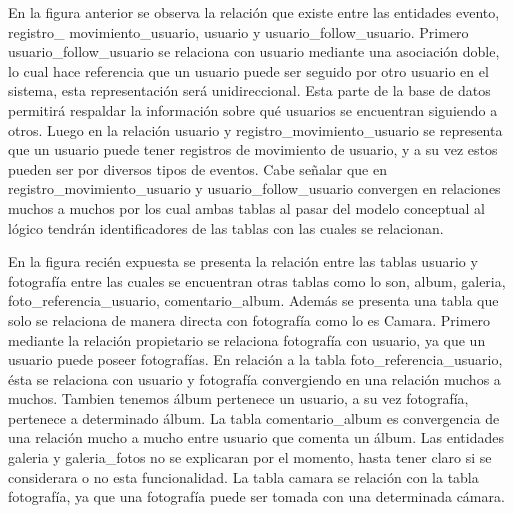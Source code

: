 \documentclass{memoria}
\begin{document}
En la figura anterior se observa la relación que existe entre las entidades evento, registro\_ movimiento\_usuario, usuario y usuario\_follow\_usuario. Primero usuario\_follow\_usuario se relaciona con usuario mediante una asociación doble, lo cual hace referencia que un usuario puede ser seguido por otro usuario en el sistema, esta representación será unidireccional.
Esta parte de la base de datos permitirá respaldar la información sobre qué usuarios se encuentran siguiendo a otros.
Luego en la relación usuario y registro\_movimiento\_usuario se representa que un usuario puede tener registros de movimiento de usuario, y a su vez estos pueden ser por diversos tipos de eventos. Cabe señalar que en registro\_movimiento\_usuario y usuario\_follow\_usuario convergen en relaciones muchos a muchos por los cual ambas tablas al pasar del modelo conceptual al lógico tendrán identificadores de las tablas con las cuales se relacionan.



En la figura recién expuesta se presenta la relación entre las tablas usuario y fotografía entre las cuales se encuentran otras tablas como lo son, album, galeria, foto\_referencia\_usuario, comentario\_album. Además se presenta una tabla que solo se relaciona de manera directa con fotografía como lo es Camara. 
Primero mediante la relación propietario se relaciona fotografía con usuario, ya que un usuario puede poseer fotografías. En relación a la tabla foto\_referencia\_usuario, ésta se relaciona con usuario y fotografía convergiendo en una relación muchos a muchos. Tambien tenemos álbum pertenece un usuario, a su vez fotografía, pertenece a determinado álbum. 
La tabla comentario\_album es convergencia de una relación mucho a mucho entre usuario que comenta un álbum. 
Las entidades galeria y galeria\_fotos no se explicaran por el momento, hasta tener claro si se considerara o no esta funcionalidad. La tabla camara se relación con la tabla fotografía, ya que una fotografía puede ser tomada con una determinada cámara. 
\end{document}
